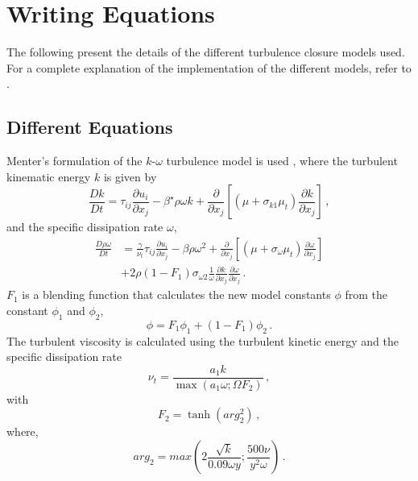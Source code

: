 \chapter{Writing Equations}

The following present the details of the different turbulence closure models used. For a complete explanation of the implementation of the different models, refer to \citet{starccm}.

\section{Different Equations}
Menter's formulation of the $k$-$\omega$ turbulence model is used \citep{menter1994two}, where the turbulent kinematic energy $k$ is given by
\begin{equation}
\frac{Dk}{Dt}=\tau_{ij}\frac{\partial u_{i}}{\partial x_{j}}-\beta^{\star}\rho\omega k+\frac{\partial}{\partial x_{j}}\left[(\mu+\sigma_{k1}\mu_{t})\frac{\partial k}{\partial x_{j}}\right] \,,
\end{equation}
and the specific dissipation rate $\omega$,
\begin{equation}
\begin{split}
\frac{D\rho\omega}{Dt} & =\frac{\gamma}{\nu_{t}}\tau_{ij}\frac{\partial u_{i}}{\partial x_{j}}-\beta\rho\omega^{2}+\frac{\partial}{\partial x_{j}}\left[(\mu+\sigma_{\omega}\mu_{t})\frac{\partial\omega}{\partial x_{j}}\right] \\
& +2\rho(1-F_{1})\sigma_{\omega 2}\frac{1}{\omega}\frac{\partial k}{\partial x_{j}}\frac{\partial\omega}{\partial x_{j}} \,.
\end{split}
\end{equation}
$F_{1}$ is a blending function that calculates the new model constants $\phi$ from the constant $\phi_{1}$ and $\phi_{2}$,
\begin{equation}
\phi=F_{1}\phi_{1}+(1-F_{1})\phi_{2} \,.
\end{equation}
The turbulent viscosity is calculated using the turbulent kinetic energy and the specific dissipation rate
\begin{equation}
\nu_{t}=\frac{a_{1}k}{\max(a_{1}\omega;\Omega F_{2})} \,,
\end{equation}
with
\begin{equation}
F_2=\tanh(arg_{2}^{2}) \,,
\end{equation}
where,
\begin{equation}
arg_{2}=max\left(2\frac{\sqrt{k}}{0.09\omega y};\frac{500\nu}{y^2 \omega}\right)  \,.
\end{equation}
